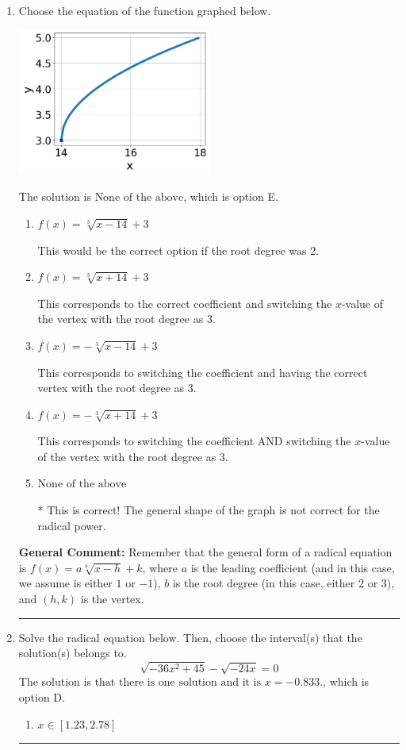 \documentclass{extbook}[14pt]
\newcommand{\litem}[1]{\item #1

\rule{\textwidth}{0.4pt}}
\begin{document}
\begin{enumerate}\litem{
Choose the equation of the function graphed below.

\begin{center}
    \includegraphics[width=0.5\textwidth]{../Figures/radicalGraphToEquationC.png}
\end{center}



The solution is \( \text{None of the above} \), which is option E.\begin{enumerate}[label=\Alph*.]
\item \( f(x) = \sqrt[3]{x - 14} + 3 \)

This would be the correct option if the root degree was $2$.
\item \( f(x) = \sqrt[3]{x + 14} + 3 \)

This corresponds to the correct coefficient and switching the $x$-value of the vertex with the root degree as $3$.
\item \( f(x) = - \sqrt[3]{x - 14} + 3 \)

This corresponds to switching the coefficient and having the correct vertex with the root degree as $3$.
\item \( f(x) = - \sqrt[3]{x + 14} + 3 \)

This corresponds to switching the coefficient AND switching the $x$-value of the vertex with the root degree as $3$.
\item \( \text{None of the above} \)

* This is correct! The general shape of the graph is not correct for the radical power.
\end{enumerate}

\textbf{General Comment:} Remember that the general form of a radical equation is $ f(x) = a \sqrt[b]{x - h} + k$, where $a$ is the leading coefficient (and in this case, we assume is either $1$ or $-1$), $b$ is the root degree (in this case, either $2$ or $3$), and $(h, k)$ is the vertex.
}
\litem{
Solve the radical equation below. Then, choose the interval(s) that the solution(s) belongs to.
\[ \sqrt{-36 x^2 + 45} - \sqrt{-24 x} = 0 \]
The solution is \( \text{that there is one solution and it is } x = -0.833. \), which is option D.\begin{enumerate}[label=\Alph*.]
\item \( x \in [1.23,2.78] \)


\end{enumerate}}
\end{enumerate}
\end{document}
